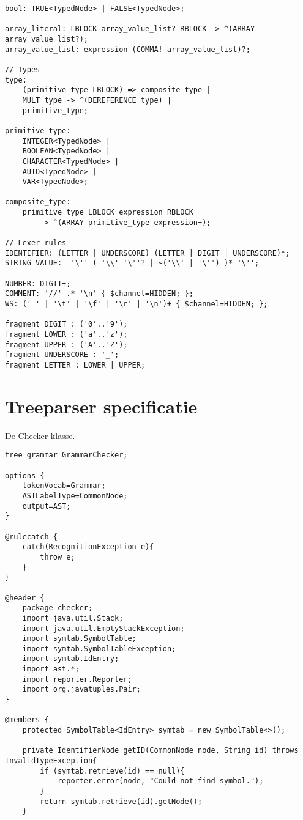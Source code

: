 \begin{landscape}
\begin{lstlisting}
bool: TRUE<TypedNode> | FALSE<TypedNode>;

array_literal: LBLOCK array_value_list? RBLOCK -> ^(ARRAY array_value_list?);
array_value_list: expression (COMMA! array_value_list)?;

// Types
type:
    (primitive_type LBLOCK) => composite_type |
    MULT type -> ^(DEREFERENCE type) |
    primitive_type;

primitive_type:
    INTEGER<TypedNode> |
    BOOLEAN<TypedNode> |
    CHARACTER<TypedNode> |
    AUTO<TypedNode> |
    VAR<TypedNode>;

composite_type:
    primitive_type LBLOCK expression RBLOCK
        -> ^(ARRAY primitive_type expression+);

// Lexer rules
IDENTIFIER: (LETTER | UNDERSCORE) (LETTER | DIGIT | UNDERSCORE)*;
STRING_VALUE:  '\'' ( '\\' '\''? | ~('\\' | '\'') )* '\'';

NUMBER: DIGIT+;
COMMENT: '//' .* '\n' { $channel=HIDDEN; };
WS: (' ' | '\t' | '\f' | '\r' | '\n')+ { $channel=HIDDEN; };

fragment DIGIT : ('0'..'9');
fragment LOWER : ('a'..'z');
fragment UPPER : ('A'..'Z');
fragment UNDERSCORE : '_';
fragment LETTER : LOWER | UPPER;
\end{lstlisting}
\section{Treeparser specificatie} %
\label{sec:treeparser_specificatie}


De Checker-klasse.
\begin{lstlisting}
tree grammar GrammarChecker;

options {
    tokenVocab=Grammar;
    ASTLabelType=CommonNode;
    output=AST;
}

@rulecatch {
    catch(RecognitionException e){
        throw e;
    }
}

@header {
    package checker;
    import java.util.Stack;
    import java.util.EmptyStackException;
    import symtab.SymbolTable;
    import symtab.SymbolTableException;
    import symtab.IdEntry;
    import ast.*;
    import reporter.Reporter;
    import org.javatuples.Pair;
}

@members {
    protected SymbolTable<IdEntry> symtab = new SymbolTable<>();

    private IdentifierNode getID(CommonNode node, String id) throws InvalidTypeException{
        if (symtab.retrieve(id) == null){
            reporter.error(node, "Could not find symbol.");
        }
        return symtab.retrieve(id).getNode();
    }


\end{lstlisting}
\end{landscape}
